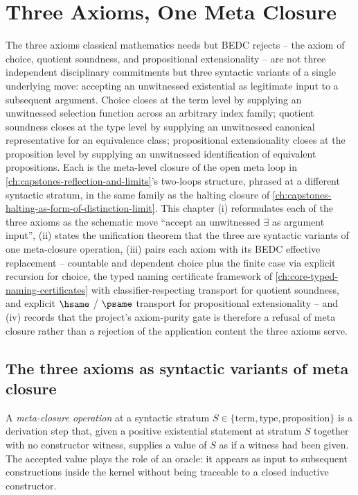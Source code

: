 \chapter{Three Axioms, One Meta Closure}
\label{ch:capstones-three-axioms-one-closure}

The three axioms classical mathematics needs but BEDC rejects -- the axiom of choice, quotient soundness, and propositional extensionality -- are not three independent disciplinary commitments but three syntactic variants of a single underlying move: accepting an unwitnessed existential as legitimate input to a subsequent argument. Choice closes at the term level by supplying an unwitnessed selection function across an arbitrary index family; quotient soundness closes at the type level by supplying an unwitnessed canonical representative for an equivalence class; propositional extensionality closes at the proposition level by supplying an unwitnessed identification of equivalent propositions. Each is the meta-level closure of the open meta loop in \autoref{ch:capstones-reflection-and-limits}'s two-loops structure, phrased at a different syntactic stratum, in the same family as the halting closure of \autoref{ch:capstones-halting-as-form-of-distinction-limit}. This chapter (i) reformulates each of the three axioms as the schematic move ``accept an unwitnessed $\exists$ as argument input'', (ii) states the unification theorem that the three are syntactic variants of one meta-closure operation, (iii) pairs each axiom with its BEDC effective replacement -- countable and dependent choice plus the finite case via explicit recursion for choice, the typed naming certificate framework of \autoref{ch:core-typed-naming-certificates} with classifier-respecting transport for quotient soundness, and explicit $\hsame$ / $\psame$ transport for propositional extensionality -- and (iv) records that the project's axiom-purity gate is therefore a refusal of meta closure rather than a rejection of the application content the three axioms serve.

\section{The three axioms as syntactic variants of meta closure}
\label{sec:three-axioms-one-closure-variants}

\begin{definition}
\label{def:three-axioms-meta-closure-operation}
A \emph{meta-closure operation} at a syntactic stratum $S \in \{\text{term}, \text{type}, \text{proposition}\}$ is a derivation step that, given a positive existential statement at stratum $S$ together with no constructor witness, supplies a value of $S$ as if a witness had been given. The accepted value plays the role of an oracle: it appears as input to subsequent constructions inside the kernel without being traceable to a closed inductive constructor.
\end{definition}


